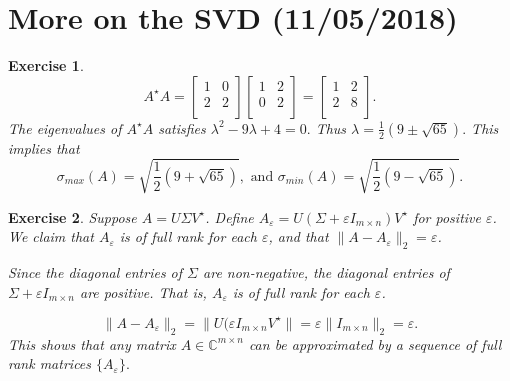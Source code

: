 \documentclass[paper=a4, fontsize=11pt]{scrartcl} %
\numberwithin{equation}{section} %
\numberwithin{figure}{section} %
\numberwithin{table}{section} %
\newtheorem{exercise}{Exercise}
\numberwithin{exercise}{section}
\begin{document}
\section{More on the SVD (11/05/2018)}
\begin{exercise}
$$A^{\star} A=\begin{bmatrix}
1 & 0 \\
2 & 2\\
\end{bmatrix} \begin{bmatrix}
1 & 2 \\
0 & 2\\
\end{bmatrix} =\begin{bmatrix}
1 & 2 \\
2 & 8\\
\end{bmatrix} .$$
The eigenvalues of $A^{\star} A$ satisfies 
$\lambda^2-9\lambda+4=0.$
Thus $\lambda=\frac{1}{2}(9\pm \sqrt{65} ).$ This implies that 
$$\sigma_{max}(A)=\sqrt{\frac{1}{2}(9+ \sqrt{65} )}, \mbox{ and } \sigma_{min}(A)=\sqrt{\frac{1}{2}(9- \sqrt{65} )}.$$
\end{exercise}
\begin{exercise}
Suppose $A=U\Sigma V^{\star}$. Define $A_{\varepsilon}=U(\Sigma+\varepsilon I_{m\times n}) V^{\star}$ for positive $\varepsilon$.  We claim that $A_{\varepsilon}$ is of full rank for each $\varepsilon$, and that $\|A-A_{\varepsilon}\|_2=\varepsilon$.

Since the diagonal entries of $\Sigma$ are non-negative, the diagonal entries of $\Sigma+\varepsilon I_{m\times n}$ are positive. That is, $A_{\varepsilon}$ is of full rank for each $\varepsilon$. 

$$\|A-A_{\varepsilon}\|_{2}=\|U(\varepsilon I_{m\times n} V^{\star}\|=\varepsilon\| I_{m\times n}\|_2=\varepsilon.$$
This shows that  any matrix $A\in\mathbb{C}^{m\times n}$ can be approximated by a sequence of full rank matrices $\{A_{\varepsilon} \}.$
\end{exercise}
\end{document}

